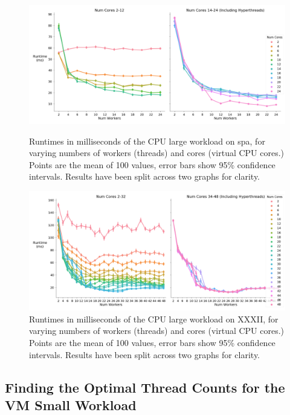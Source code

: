 \begin{figure}[H]
    \vspace*{-2.5cm}
    \centerline{\includegraphics[width=1.5\textwidth]{graphics/optimal_threads/spa/optimal_threads_cpu_large.png}}
    \caption{Runtimes in milliseconds of the CPU large workload on spa, for varying numbers of workers (threads) and cores (virtual CPU cores.) Points are the mean of 100 values, error bars show 95\% confidence intervals. Results have been split across two graphs for clarity.}
    \label{fig:opt_spa_cpu_large}
    
    \centerline{\includegraphics[width=1.5\textwidth]{graphics/optimal_threads/XXXII/optimal_threads_cpu_large.png}}
    \caption{Runtimes in milliseconds of the CPU large workload on XXXII, for varying numbers of workers (threads) and cores (virtual CPU cores.) Points are the mean of 100 values, error bars show 95\% confidence intervals. Results have been split across two graphs for clarity.}
    \label{fig:opt_xxxii_cpu_large}
\end{figure}



\subsection{Finding the Optimal Thread Counts for the VM Small Workload}
\label{section:results:finding_the_optimal_thread_couonts_for_the_vm_small_workload}

